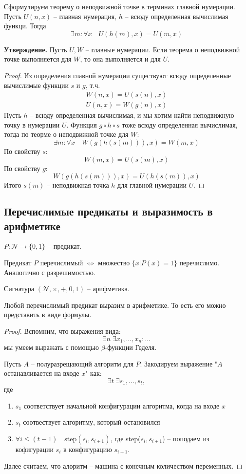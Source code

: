 Сформулируем теорему о неподвижной точке в терминах главной нумерации. Пусть $U(n, x)$ -- главная нумерация, $h$ -- всюду определенная вычислимая функци. Тогда \[ \exists m : \forall x \quad U(h(m), x) = U(m, x) \]

\textbf{Утверждение.} Пусть $U, W$ -- главные нумерации. Если теорема о неподвижной точке выполняется для $W$, то она выполняется и для $U$. 
\begin{proof}
    Из определения главной нумерации существуют всюду определенные вычислимые функции $s$ и $g$, т.ч. \begin{gather*}
        W(n, x) = U(s(n), x) \\
        U(n, x) = W(g(n), x)
    \end{gather*}
    Пусть $h$ -- всюду определенная вычислимая, и мы хотим найти неподвижную точку в нумерации $U$.  Функция $g \circ h \circ s$ тоже всюду определенная вычислимая, тогда по теорме о неподвижной точке для $W$: \[ \exists m : \forall x \quad W(g(h(s(m))), x) = W(m, x) \]
    По свойству $s$: \[ W(m, x) = U(s(m), x) \]
    По свойству $g$: \[ W(g(h(s(m))), x) = U(h(s(m)), x) \]
    Итого $s(m)$ -- неподвижная точка $h$ для главной нумерации $U$.
\end{proof}

\subsection{Перечислимые предикаты и выразимость в арифметике}
\begin{conj}
    $P: \mathcal{N} \to \{ 0, 1 \}$ -- предикат.
\end{conj}
\begin{conj}
    Предикат $P$ перечислимый $\Leftrightarrow$ множество $\{ x | P(x) = 1 \}$ перечислимо. Аналогично с разрешимостью.
\end{conj}
\begin{conj}
    Сигнатура $(\mathcal{N}, \times, +, 0, 1)$ -- арифметика.
\end{conj}
\begin{theorem}
    Любой перечислимый предикат выразим в арифметике. То есть его можно представить в виде формулы.
\end{theorem}
\begin{proof}
    Вспомним, что выражения вида: \[ \exists n \; \exists x_1, \dots, x_n : \dots \] мы умеем выражать с помощью $\beta$-функции Геделя. 

    Пусть $A$ -- полуразрещающий алгоритм для $P$. Закодируем выражение "$A$ останавливается на входе $x$" как: \[ \exists t \; \exists s_1, \dots, s_t, \]где 
    \begin{enumerate}
        \item $s_1$ соответствует начальной конфигурации алгоритма, когда на входе $x$
        \item $s_t$ соотвествует алгоритму, который остановился
        \item $\forall i \leqslant (t - 1) \quad \text{step}(s_i, s_{i+1})$, где step($s_i, s_{i+1}$) -- поподаем из кофигурации $s_i$ в конфигурацию $s_{i+1}$.
    \end{enumerate}
    Далее считаем, что алоритм -- машина с конечным количеством переменных. 
\end{proof}